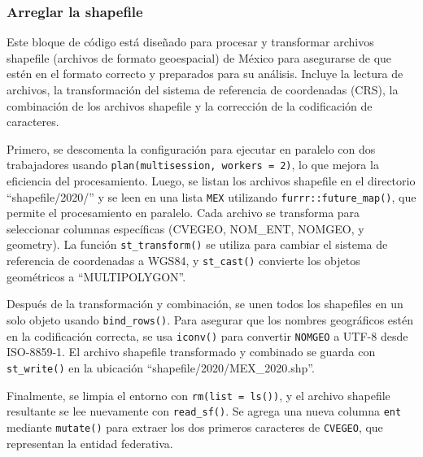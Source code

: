 \documentclass[
  12pt,
]{book}
\begin{document}
\hypertarget{arreglar-la-shapefile}{%
\subsubsection*{Arreglar la shapefile}\label{arreglar-la-shapefile}}

Este bloque de código está diseñado para procesar y transformar archivos shapefile (archivos de formato geoespacial) de México para asegurarse de que estén en el formato correcto y preparados para su análisis. Incluye la lectura de archivos, la transformación del sistema de referencia de coordenadas (CRS), la combinación de los archivos shapefile y la corrección de la codificación de caracteres.

Primero, se descomenta la configuración para ejecutar en paralelo con dos trabajadores usando \texttt{plan(multisession,\ workers\ =\ 2)}, lo que mejora la eficiencia del procesamiento. Luego, se listan los archivos shapefile en el directorio ``shapefile/2020/'' y se leen en una lista \texttt{MEX} utilizando \texttt{furrr::future\_map()}, que permite el procesamiento en paralelo. Cada archivo se transforma para seleccionar columnas específicas (CVEGEO, NOM\_ENT, NOMGEO, y geometry). La función \texttt{st\_transform()} se utiliza para cambiar el sistema de referencia de coordenadas a WGS84, y \texttt{st\_cast()} convierte los objetos geométricos a ``MULTIPOLYGON''.

Después de la transformación y combinación, se unen todos los shapefiles en un solo objeto usando \texttt{bind\_rows()}. Para asegurar que los nombres geográficos estén en la codificación correcta, se usa \texttt{iconv()} para convertir \texttt{NOMGEO} a UTF-8 desde ISO-8859-1. El archivo shapefile transformado y combinado se guarda con \texttt{st\_write()} en la ubicación ``shapefile/2020/MEX\_2020.shp''.

Finalmente, se limpia el entorno con \texttt{rm(list\ =\ ls())}, y el archivo shapefile resultante se lee nuevamente con \texttt{read\_sf()}. Se agrega una nueva columna \texttt{ent} mediante \texttt{mutate()} para extraer los dos primeros caracteres de \texttt{CVEGEO}, que representan la entidad federativa.
\end{document}
